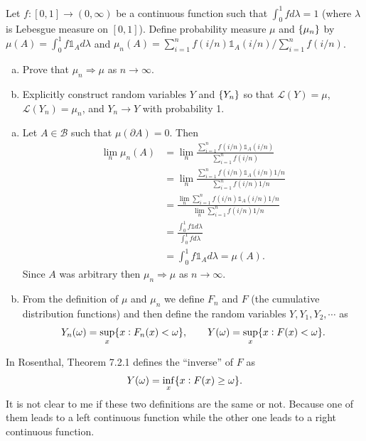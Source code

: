 \begin{problem}
	Let $ f:[0,1]\to (0,\infty) $ be a continuous function such that $ \int_{0}^{1}fd\lambda = 1 $ (where $ \lambda $ is Lebesgue measure on $ [0,1] $). Define probability measure $ \mu $ and $ \{\mu_n\} $ by $ \mu(A) = \int_{0}^{1}f\mathds{1}_A d\lambda $ and $ \mu_n(A) = \sum_{i=1}^{n}f(i/n)\mathds{1}_{A}(i/n)/\sum_{i=1}^{n}f(i/n) $.
	\begin{enumerate}[(a)]
		\item Prove that $ \mu_n \Rightarrow \mu $ as $ n\to\infty $.
		\item Explicitly construct  random variables $ Y $ and $ \{Y_n\} $ so that $ \mathcal{L}(Y)=\mu $, $ \mathcal{L}(Y_n)=\mu_n $, and $ Y_n\to Y $ with probability 1. 
	\end{enumerate}
\end{problem}
\begin{solution}
	\begin{enumerate}[(a)]
		\item Let $ A \in \mathcal{B} $ such that $ \mu(\partial A) = 0 $. Then
		\begin{align*}
			\lim_n \mu_n(A) &= \lim_n \frac{\sum_{i=1}^{n}f(i/n)\mathds{1}_{A}(i/n)}{\sum_{i=1}^{n}f(i/n)} \\
			&= \lim_n \frac{\sum_{i=1}^{n}f(i/n)\mathds{1}_{A}(i/n)1/n}{\sum_{i=1}^{n}f(i/n)1/n} \\
			&= \frac{\lim_n \sum_{i=1}^{n}f(i/n)\mathds{1}_{A}(i/n)1/n}{\lim_n \sum_{i=1}^{n}f(i/n)1/n} \\
			&= \frac{\int_{0}^{1} f \mathds{1} d\lambda}{\int_{0}^{1} f d\lambda} \\
			&= \int_{0}^{1}f\mathds{1}_A d\lambda  = \mu(A).
		\end{align*}
		Since $ A $ was arbitrary then $ \mu_n \Rightarrow \mu $ as $ n\to\infty $.
		
		\item From the definition of $ \mu $ and $ \mu_n $ we define $ F_n $ and $ F $ (the cumulative distribution functions) and then define the random variables $ Y, Y_1,Y_2,\cdots $ as
		\[ Y_n(\omega) = \sup_x\{x: F_n(x)< \omega\},\qquad Y(\omega)= \sup_x \{x: F(x)<\omega\}. \]
	\end{enumerate}
\end{solution}
\begin{remark}
	In Rosenthal, Theorem 7.2.1 defines the ``inverse'' of $ F $ as
	\[ Y(\omega) = \inf_x\{x: F(x)\geq \omega\}. \]
	{\color{red} \noindent  It is not clear to me }if these two definitions are the same or not. Because one of them leads to a left continuous function while the other one leads to a right continuous function.
\end{remark}


